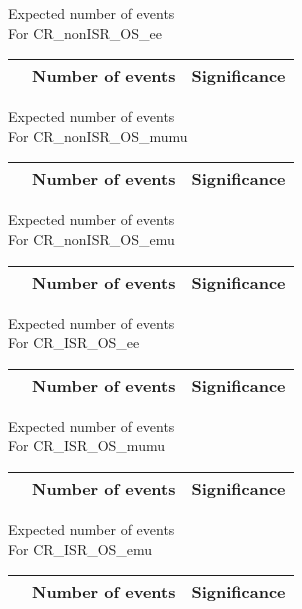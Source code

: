 \begin{frame}{Expected number of events \\ For CR\_nonISR\_OS\_ee}
\vspace{5mm}
\begin{tabular}{|c|c|c|}
\hline
& Number of events & Significance \\
\hline

\end{tabular}
\end{frame}

\begin{frame}{Expected number of events \\ For CR\_nonISR\_OS\_mumu}
\vspace{5mm}
\begin{tabular}{|c|c|c|}
\hline
& Number of events & Significance \\
\hline

\end{tabular}
\end{frame}

\begin{frame}{Expected number of events \\ For CR\_nonISR\_OS\_emu}
\vspace{5mm}
\begin{tabular}{|c|c|c|}
\hline
& Number of events & Significance \\
\hline

\end{tabular}
\end{frame}

\begin{frame}{Expected number of events \\ For CR\_ISR\_OS\_ee}
\vspace{5mm}
\begin{tabular}{|c|c|c|}
\hline
& Number of events & Significance \\
\hline

\end{tabular}
\end{frame}

\begin{frame}{Expected number of events \\ For CR\_ISR\_OS\_mumu}
\vspace{5mm}
\begin{tabular}{|c|c|c|}
\hline
& Number of events & Significance \\
\hline

\end{tabular}
\end{frame}

\begin{frame}{Expected number of events \\ For CR\_ISR\_OS\_emu}
\vspace{5mm}
\begin{tabular}{|c|c|c|}
\hline
& Number of events & Significance \\
\hline

\end{tabular}
\end{frame}

